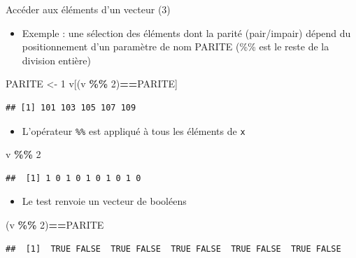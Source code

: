 \documentclass[
  ignorenonframetext,
]{beamer}
\newenvironment{Shaded}{\begin{snugshade}}{\end{snugshade}}
\newcommand{\DecValTok}[1]{\textcolor[rgb]{0.00,0.00,0.81}{#1}}
\newcommand{\NormalTok}[1]{#1}
\newcommand{\OtherTok}[1]{\textcolor[rgb]{0.56,0.35,0.01}{#1}}
\newcommand{\SpecialCharTok}[1]{\textcolor[rgb]{0.81,0.36,0.00}{\textbf{#1}}}
\providecommand{\tightlist}{%
  \setlength{\itemsep}{0pt}\setlength{\parskip}{0pt}}
\begin{document}
\begin{frame}[fragile]{Accéder aux éléments d'un vecteur (3)}
\protect\hypertarget{accuxe9der-aux-uxe9luxe9ments-dun-vecteur-3}{}
\begin{itemize}
\tightlist
\item
  Exemple : une sélection des éléments dont la parité (pair/impair)
  dépend du positionnement d'un paramètre de nom PARITE (\%\% est le
  reste de la division entière)
\end{itemize}

\tiny

\begin{Shaded}
\begin{Highlighting}[]
\NormalTok{PARITE }\OtherTok{\textless{}{-}} \DecValTok{1}
\NormalTok{v[(v }\SpecialCharTok{\%\%} \DecValTok{2}\NormalTok{)}\SpecialCharTok{==}\NormalTok{PARITE]}
\end{Highlighting}
\end{Shaded}

\begin{verbatim}
## [1] 101 103 105 107 109
\end{verbatim}

\normalsize

\begin{itemize}
\tightlist
\item
  L'opérateur \texttt{\%\%} est appliqué à tous les éléments de
  \texttt{x}
\end{itemize}

\tiny

\begin{Shaded}
\begin{Highlighting}[]
\NormalTok{v }\SpecialCharTok{\%\%} \DecValTok{2}
\end{Highlighting}
\end{Shaded}

\begin{verbatim}
##  [1] 1 0 1 0 1 0 1 0 1 0
\end{verbatim}

\normalsize

\begin{itemize}
\tightlist
\item
  Le test renvoie un vecteur de booléens
\end{itemize}

\tiny

\begin{Shaded}
\begin{Highlighting}[]
\NormalTok{(v }\SpecialCharTok{\%\%} \DecValTok{2}\NormalTok{)}\SpecialCharTok{==}\NormalTok{PARITE}
\end{Highlighting}
\end{Shaded}

\begin{verbatim}
##  [1]  TRUE FALSE  TRUE FALSE  TRUE FALSE  TRUE FALSE  TRUE FALSE
\end{verbatim}

\normalsize
\end{frame}
\end{document}
